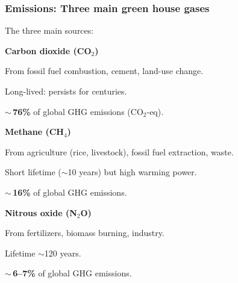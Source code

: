 \documentclass[xcolor=x11names,compress,aspectratio=169]{beamer}%
\makeatletter
\renewenvironment{itemize}{\begin{compactitemize}[<+-| alert@+>]}{\end{compactitemize}}
\makeatother
\begin{document}
\begin{frame}%
%

\frametitle{Emissions: Three main green house gases}%


The three main sources:

\begin{itemize}
\item \textbf{Carbon dioxide (CO$_{2}$)}

\begin{itemize}
\item {\footnotesize From fossil fuel combustion, cement, land-use change. }

\item {\footnotesize Long-lived: persists for centuries. }

\item {\footnotesize $\sim$\,\textbf{76\%} of global GHG emissions (CO$_{2}%
$-eq). }
\end{itemize}

\item \textbf{Methane (CH$_{4}$)}

\begin{itemize}
\item {\footnotesize From agriculture (rice, livestock), fossil fuel
extraction, waste. }

\item {\footnotesize Short lifetime ($\sim$10 years) but high warming power. }

\item {\footnotesize $\sim$\,\textbf{16\%} of global GHG emissions. }
\end{itemize}

\item \textbf{Nitrous oxide (N$_{2}$O)}

\begin{itemize}
\item {\footnotesize From fertilizers, biomass burning, industry. }

\item {\footnotesize Lifetime $\sim$120 years. }

\item {\footnotesize $\sim$\,\textbf{6--7\%} of global GHG emissions. }
\end{itemize}
\end{itemize}

%

\transboxout
\end{frame}%
%
\end{document}
